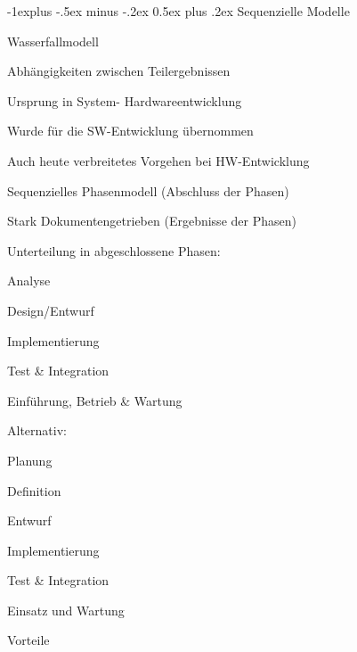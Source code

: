 \documentclass[a4paper]{article}
\makeatletter
\renewcommand{\subsection}{\@startsection{subsection}{2}{0mm}%
                                {-1explus -.5ex minus -.2ex}%
                                {0.5ex plus .2ex}%
                                {\normalfont\normalsize\bfseries}}
\makeatother
\begin{document}
\begin{multicols}{3}
  \subsection{Sequenzielle Modelle}
  \begin{itemize*}
    \item Wasserfallmodell
          \begin{itemize*}
            \item Abhängigkeiten zwischen Teilergebnissen
            \item Ursprung in System- Hardwareentwicklung
                  \begin{itemize*}
                    \item Wurde für die SW-Entwicklung übernommen
                    \item Auch heute verbreitetes Vorgehen bei HW-Entwicklung
                  \end{itemize*}
            \item Sequenzielles Phasenmodell (Abschluss der Phasen)
            \item Stark Dokumentengetrieben (Ergebnisse der Phasen)
            \item Unterteilung in abgeschlossene Phasen:
                  \begin{itemize*}
                    \item Analyse
                    \item Design/Entwurf
                    \item Implementierung
                    \item Test \& Integration
                    \item Einführung, Betrieb \& Wartung
                  \end{itemize*}
            \item Alternativ:
                  \begin{itemize*}
                    \item Planung
                    \item Definition
                    \item Entwurf
                    \item Implementierung
                    \item Test \& Integration
                    \item Einsatz und Wartung
                  \end{itemize*}
            \item Vorteile

\end{itemize*}
\end{itemize*}
\end{multicols}
\end{document}
